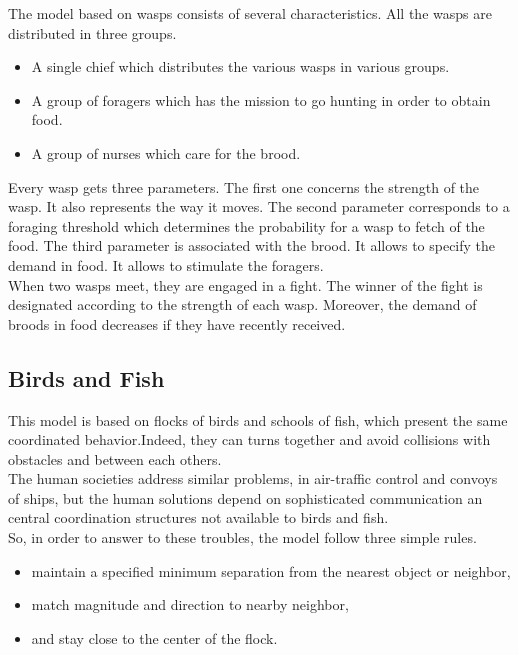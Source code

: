 The model based on wasps consists of several characteristics.
All the wasps are distributed in three groups.
\begin{itemize}
\item A single chief which distributes the various wasps in various groups.
\item A group of foragers which has the mission to go hunting in order to obtain food.
\item A group of nurses which care for the brood.
\end{itemize}

Every wasp gets three parameters. The first one concerns the strength of the wasp. It also represents the way it moves. The second parameter corresponds to a foraging threshold which determines the probability for a wasp to fetch of the food. The third parameter is associated with the brood. It allows to specify the demand in food. It allows to stimulate the foragers.\\
When two wasps meet, they are engaged in a fight.
The winner of the fight is designated according to the strength of each wasp. Moreover, the demand of broods in food decreases if they have recently received.

\subsection{Birds and Fish}

This model is based on flocks of birds and schools of fish, which present the same coordinated behavior.Indeed, they can turns together and avoid collisions with obstacles and between each others.\\

The human societies address similar problems, in air-traffic control and convoys of ships, but the human solutions depend on sophisticated communication an central coordination structures not available to birds and fish.\\

So, in order to answer to these troubles, the model follow three simple rules.
\begin{itemize}
\item maintain a specified minimum separation from the nearest object or neighbor,
\item match magnitude and direction to nearby neighbor,
\item and stay close to the center of the flock.
\end{itemize}

